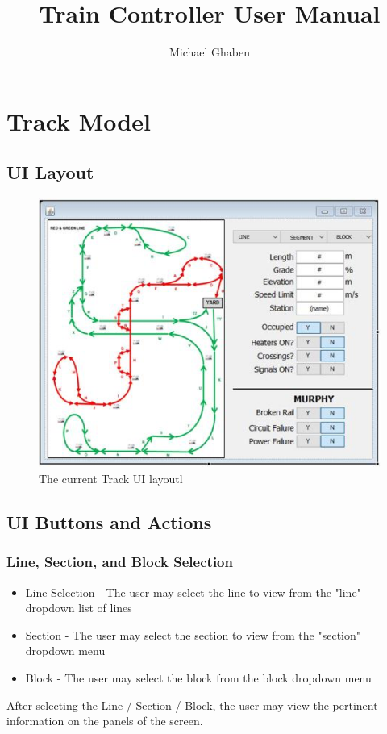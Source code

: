 \documentclass[letterpaper]{article}
\begin{document}
\title{Train Controller User Manual}
\author{Michael Ghaben}
\date{}

\maketitle


\section{Track Model}

\subsection{UI Layout}
\begin{figure}[h]
	\centering
	\includegraphics{trackUI.PNG}
	\caption{The current Track UI layoutl}
\end{figure}


\subsection{UI Buttons and Actions}

	\subsubsection{Line, Section, and Block Selection}
		\begin{itemize}
			\item Line Selection - The user may select the line to view from the "line" dropdown list of lines 
			\item Section - The user may select the section to view from the "section" dropdown menu
			\item Block - The user may select the block from the block dropdown menu
		\end{itemize}
		After selecting the Line / Section / Block, the user may view the pertinent information on the panels of the screen.
\end{document}
